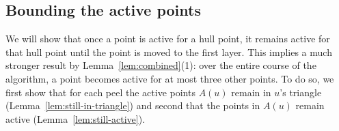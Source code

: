 \documentclass{cccg24}
\begin{document}
\subsection{Bounding the active points}
We will show that once a point is active for a hull point, it remains active for that hull point until the point is moved to the first layer. This implies a much stronger result by Lemma~\ref{lem:combined}(1): over the entire course of the algorithm, a point becomes active for at most three other points. To do so, we first show that for each peel the active points $A(u)$ remain in $u$'s triangle (Lemma~\ref{lem:still-in-triangle}) and second that the points in $A(u)$ remain active (Lemma~\ref{lem:still-active}). %

\end{document}
